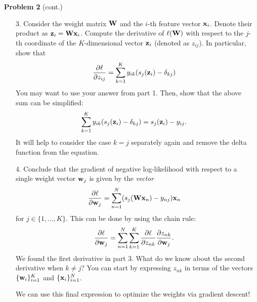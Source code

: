 \documentclass[submit]{harvardml}
\begin{document}
\begin{framed}
\noindent\textbf{Problem 2} (cont.)\\
\begin{enumerate}
    \item[3.] Consider the weight matrix $\mathbf{W}$ and the $i$-th feature vector $\mathbf{x}_i$. Denote their product as $\mathbf{z}_i = \mathbf{W}\mathbf{x}_i$. Compute the derivative of $\ell(\mathbf{W})$ with respect to the $j$-th coordinate of the $K$-dimensional vector $\mathbf{z}_i$ (denoted as $z_{ij}$). In particular, show that 
    $$
    \frac{\partial \ell}{\partial z_{ij}} = \sum_{k = 1}^K y_{ik}(s_j(\mathbf{z}_i) - \delta_{kj})
    $$
    You may want to use your answer from part 1. Then, show that the above sum can be simplified:
    $$
    \sum_{k = 1}^K y_{ik}(s_j(\mathbf{z}_i) - \delta_{kj}) = s_j(\mathbf{z}_i) - y_{ij}.
    $$
    It will help to consider the case $k = j$ separately again and remove the delta function from the equation.
    \item[4.] Conclude that the gradient of negative log-likelihood with respect to a single weight vector $\mathbf{w}_j$ is given by the \textit{vector}
    $$
    \frac{\partial \ell}{\partial \mathbf{w}_j} = \sum_{n = 1}^N(s_j(\mathbf{W}\mathbf{x}_n) - y_{nj})\mathbf{x}_n
    $$
    for $j \in \{1, \dots, K\}$. This can be done by using the chain rule:
    $$
    \frac{\partial \ell}{\partial \mathbf{w}_j} = \sum_{n = 1}^N\sum_{k = 1}^K\frac{\partial \ell}{\partial z_{nk}}\frac{\partial z_{nk}}{\partial \mathbf{w}_j}.
    $$
    We found the first derivative in part 3. What do we know about the second derivative when $k \neq j$? You can start by expressing $z_{nk}$ in terms of the vectors $\{\mathbf{w}_i\}_{i=1}^K$ and $\{\mathbf{x}_i\}_{i=1}^N$.
    
    We can use this final expression to optimize the weights via gradient descent!
\end{enumerate}
\end{framed}
\end{document}
